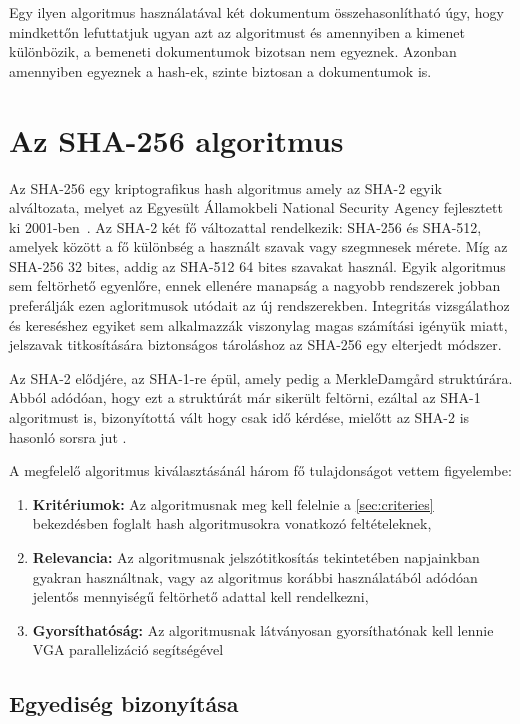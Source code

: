Egy ilyen algoritmus használatával két dokumentum összehasonlítható úgy, hogy mindkettőn lefuttatjuk ugyan azt az algoritmust és amennyiben a kimenet különbözik, a bemeneti dokumentumok bizotsan nem egyeznek. Azonban amennyiben egyeznek a hash-ek, szinte biztosan a dokumentumok is.

\section{Az SHA-256 algoritmus}

Az SHA-256 egy kriptografikus hash algoritmus amely az SHA-2 egyik alváltozata, melyet az Egyesült Államokbeli National Security Agency fejlesztett ki 2001-ben~\cite{gueron2011sha}. Az SHA-2 két fő változattal rendelkezik: SHA-256 és SHA-512, amelyek között a fő különbség a használt szavak vagy szegmnesek mérete. Míg az SHA-256 32 bites, addig az SHA-512 64 bites szavakat használ. Egyik algoritmus sem feltörhető egyenlőre, ennek ellenére manapság a nagyobb rendszerek jobban preferálják ezen agloritmusok utódait az új rendszerekben. Integritás vizsgálathoz és kereséshez egyiket sem alkalmazzák viszonylag magas számítási igényük miatt, jelszavak titkosítására biztonságos tároláshoz az SHA-256 egy elterjedt módszer.

Az SHA-2 elődjére, az SHA-1-re épül, amely pedig a MerkleDamgård struktúrára. Abból adódóan, hogy ezt a struktúrát már sikerült feltörni, ezáltal az SHA-1 algoritmust is, bizonyítottá vált hogy csak idő kérdése, mielőtt az SHA-2 is hasonló sorsra jut \cite{sha2017survey}.

A megfelelő algoritmus kiválasztásánál három fő tulajdonságot vettem figyelembe:

\begin{enumerate}
  \item \textbf{Kritériumok:} Az algoritmusnak meg kell felelnie a \ref{sec:criteries} bekezdésben foglalt hash algoritmusokra vonatkozó feltételeknek,
  \item \textbf{Relevancia:} Az algoritmusnak jelszótitkosítás tekintetében napjainkban gyakran használtnak, vagy az algoritmus korábbi használatából adódóan jelentős mennyiségű feltörhető adattal kell rendelkezni,
  \item \textbf{Gyorsíthatóság:} Az algoritmusnak látványosan gyorsíthatónak kell lennie VGA parallelizáció segítségével
\end{enumerate}


\subsection{Egyediség bizonyítása}

